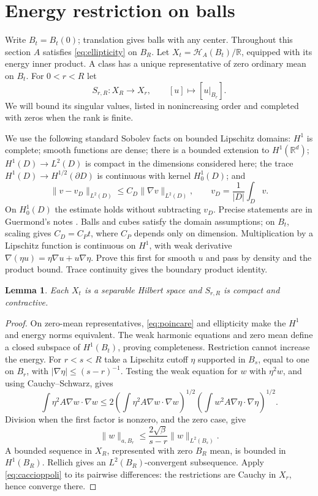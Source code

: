 \documentclass[11pt]{article}
\newtheorem{lemma}[theorem]{Lemma}
\theoremstyle{remark}
\newcommand{\R}{\mathbb R}
\newcommand{\Ha}{\mathcal H_A}
\newcommand{\norma}[2]{\|#1\|_{a,#2}}
\newcommand{\mean}[2]{\frac{1}{|#2|}\int_{#2}#1}
\begin{document}
\section{Energy restriction on balls}\label{sec:balls}
Write $B_t=B_t(0)$; translation gives balls with any center.
Throughout this section $A$ satisfies \eqref{eq:ellipticity} on $B_R$.
Let $X_t=\Ha(B_t)/\R$, equipped with its energy inner product. A class
has a unique representative of zero ordinary mean on $B_t$.
For $0<r<R$ let
\[
 S_{r,R}:X_R\longrightarrow X_r,\qquad [u]\longmapsto[u|_{B_r}].
\]
We will bound its singular values, listed in nonincreasing order and
completed with zeros when the rank is finite.

We use the following standard Sobolev facts on bounded Lipschitz domains:
$H^1$ is complete; smooth functions are dense; there is a bounded extension
to $H^1(\R^d)$; $H^1(D)\to L^2(D)$ is compact in the
dimensions considered here; the trace $H^1(D)\to H^{1/2}(\partial D)$
is continuous with kernel $H^1_0(D)$; and
\begin{equation}\label{eq:poincare}
 \|v-v_D\|_{L^2(D)}\le C_D\|\nabla v\|_{L^2(D)},
 \qquad v_D=\mean{v}{D}.
\end{equation}
On $H^1_0(D)$ the estimate holds without subtracting $v_D$.
Precise statements are in Guermond's notes
\cite[Proposition 2.9, Theorems 2.21, 2.30, 2.35 and 3.10,
Lemmas 3.24 and 3.27]{GuermondNotes}. Balls and cubes satisfy the
domain assumptions; on $B_t$, scaling gives $C_D=C_Pt$, where $C_P$
depends only on dimension. Multiplication by a Lipschitz function is
continuous on $H^1$, with weak derivative
$\nabla(\eta u)=\eta\nabla u+u\nabla\eta$. Prove this first for smooth
$u$ and pass by density and the product bound. Trace continuity
gives the boundary product identity.

\begin{lemma}\label{lem:compact}
Each $X_t$ is a separable Hilbert space and $S_{r,R}$ is compact and
contractive.
\end{lemma}
\begin{proof}
On zero-mean representatives, \eqref{eq:poincare} and ellipticity make
the $H^1$ and energy norms equivalent. The weak harmonic equations and
zero mean define a closed subspace of $H^1(B_t)$, proving completeness.
Restriction cannot increase the energy.
For $r<s<R$ take a Lipschitz cutoff $\eta$ supported in $B_s$, equal
to one on $B_r$, with $|\nabla\eta|\le(s-r)^{-1}$. Testing the weak
equation for $w$ with $\eta^2w$, and using Cauchy--Schwarz, gives
\[
 \int\eta^2 A\nabla w\cdot\nabla w
 \le2\left(\int\eta^2 A\nabla w\cdot\nabla w\right)^{1/2}
       \left(\int w^2 A\nabla\eta\cdot\nabla\eta\right)^{1/2}.
\]
Division when the first factor is nonzero, and the zero case, give
\begin{equation}\label{eq:caccioppoli}
 \norma{w}{B_r}\le\frac{2\sqrt\beta}{s-r}\|w\|_{L^2(B_s)}.
\end{equation}
A bounded sequence in $X_R$, represented with zero $B_R$ mean, is
bounded in $H^1(B_R)$. Rellich gives an $L^2(B_R)$-convergent
subsequence. Apply \eqref{eq:caccioppoli} to its pairwise differences:
the restrictions are Cauchy in $X_r$, hence converge there.
\end{proof}
\end{document}
